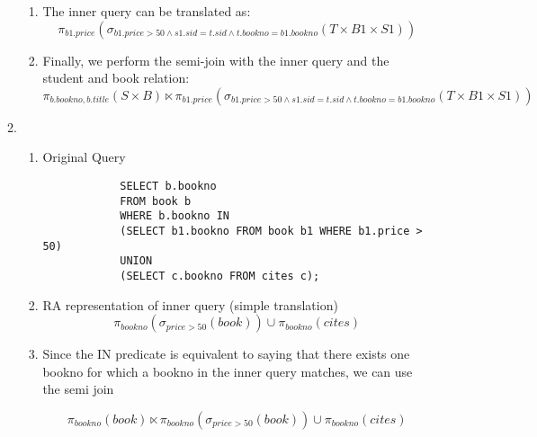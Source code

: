 \documentclass{article}
\begin{document}
\begin{enumerate}
\begin{enumerate}
\begin{enumerate}
            \item The inner query can be translated as:
            \begin{displaymath}
                \pi_{b1.price}(
                    \sigma_{b1.price>50 \wedge s1.sid=t.sid \wedge t.bookno=b1.bookno}(T \times B1 \times S1
                    ))
            \end{displaymath}

            \item Finally, we perform the semi-join with the inner query and the student and book relation:
            \begin{displaymath}
                \pi_{b.bookno, b.title}(S \times B) \ltimes
                \pi_{b1.price}(
                    \sigma_{b1.price>50 \wedge s1.sid=t.sid \wedge t.bookno=b1.bookno}(T \times B1 \times S1
                    ))
            \end{displaymath}



        \end{enumerate}

        \item %

        \begin{enumerate}
            \item Original Query
            \begin{lstlisting}
            SELECT b.bookno
            FROM book b
            WHERE b.bookno IN
            (SELECT b1.bookno FROM book b1 WHERE b1.price > 50)
            UNION
            (SELECT c.bookno FROM cites c);
            \end{lstlisting}

            \item RA representation of inner query (simple translation)
            \begin{displaymath}
                \pi_{bookno}(\sigma_{price > 50}(book)) \cup \pi_{bookno}(cites)
            \end{displaymath}

            \item Since the IN predicate is equivalent to saying that there exists one bookno for which a bookno in the inner query matches, we can use the semi join

            \begin{displaymath}
                \pi_{bookno}(book) \ltimes \pi_{bookno}(\sigma_{price > 50}(book)) \cup \pi_{bookno}(cites)
            \end{displaymath}


\end{enumerate}
\end{enumerate}
\end{enumerate}
\end{document}
